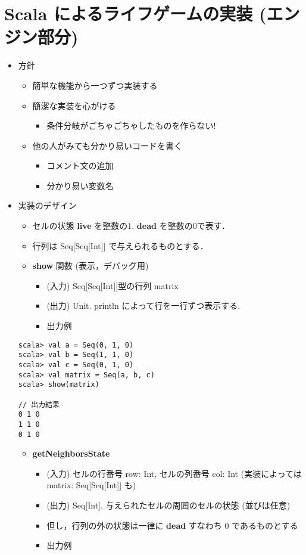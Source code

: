 \documentclass[a4j]{article}
\begin{document}
  
\section*{Scala によるライフゲームの実装 (エンジン部分)}
\label{sec-3}
\begin{itemize}

\item 方針
\label{sec-3-1}%
\begin{itemize}
\item 簡単な機能から一つずつ実装する
\item 簡潔な実装を心がける
\begin{itemize}
\item 条件分岐がごちゃごちゃしたものを作らない!
\end{itemize}
\item 他の人がみても分かり易いコードを書く
\begin{itemize}
\item コメント文の追加
\item 分かり易い変数名
\end{itemize}
\end{itemize}

\item 実装のデザイン
\label{sec-3-2}%
\begin{itemize}
\item セルの状態 \textbf{live} を整数の1, \textbf{dead} を整数の0で表す．
\item 行列は Seq[Seq[Int]] で与えられるものとする．
\item \textbf{show} 関数 (表示，デバッグ用)
\begin{itemize}
\item (入力) Seq[Seq[Int]]型の行列 matrix
\item (出力) Unit. println によって行を一行ずつ表示する.
\item 出力例
\end{itemize}
\end{itemize}

\begin{verbatim}
scala> val a = Seq(0, 1, 0)      
scala> val b = Seq(1, 1, 0)      
scala> val c = Seq(0, 1, 0)      
scala> val matrix = Seq(a, b, c)                           
scala> show(matrix)              

// 出力結果
0 1 0
1 1 0
0 1 0
\end{verbatim}
\begin{itemize}
\item \textbf{getNeighborsState}
\begin{itemize}
\item (入力) セルの行番号 row: Int, セルの列番号 col: Int (実装によっては matrix: Seq[Seq[Int]] も)
\item (出力) Seq[Int]. 与えられたセルの周囲のセルの状態 (並びは任意)
\item 但し，行列の外の状態は一律に \textbf{dead} すなわち 0 であるものとする
\item 出力例
\end{itemize}
\end{itemize}


\end{itemize}
\end{document}
